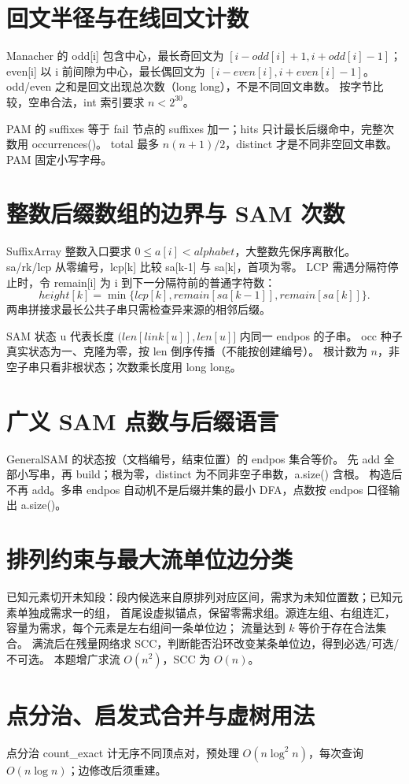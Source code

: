 \section{回文半径与在线回文计数}\label{knowledge-palindrome}
Manacher 的 odd[i] 包含中心，最长奇回文为 $[i-odd[i]+1,i+odd[i]-1]$；
even[i] 以 i 前间隙为中心，最长偶回文为 $[i-even[i],i+even[i]-1]$。
odd/even 之和是回文出现总次数（long long），不是不同回文串数。
按字节比较，空串合法，int 索引要求 $n<2^{30}$。

PAM 的 suffixes 等于 fail 节点的 suffixes 加一；hits 只计最长后缀命中，完整次数用 occurrences()。
total 最多 $n(n+1)/2$，distinct 才是不同非空回文串数。PAM 固定小写字母。
\section{整数后缀数组的边界与 SAM 次数}\label{knowledge-suffix-bounds}
SuffixArray 整数入口要求 $0\le a[i]<alphabet$，大整数先保序离散化。
sa/rk/lcp 从零编号，lcp[k] 比较 sa[k-1] 与 sa[k]，首项为零。
LCP 需遇分隔符停止时，令 remain[i] 为 i 到下一分隔符前的普通字符数：
\[
 height[k]=\min\{lcp[k],remain[sa[k-1]],remain[sa[k]]\}.
\]
两串拼接求最长公共子串只需检查异来源的相邻后缀。

SAM 状态 u 代表长度 $(len[link[u]],len[u]]$ 内同一 endpos 的子串。
occ 种子真实状态为一、克隆为零，按 len 倒序传播（不能按创建编号）。
根计数为 $n$，非空子串只看非根状态；次数乘长度用 long long。
\section{广义 SAM 点数与后缀语言}\label{knowledge-general-sam}
GeneralSAM 的状态按（文档编号，结束位置）的 endpos 集合等价。
先 add 全部小写串，再 build；根为零，distinct 为不同非空子串数，a.size() 含根。
构造后不再 add。多串 endpos 自动机不是后缀并集的最小 DFA，点数按 endpos 口径输出 a.size()。
\section{排列约束与最大流单位边分类}\label{knowledge-flow-units}
已知元素切开未知段：段内候选来自原排列对应区间，需求为未知位置数；已知元素单独成需求一的组，
首尾设虚拟锚点，保留零需求组。源连左组、右组连汇，容量为需求，每个元素是左右组间一条单位边；
流量达到 $k$ 等价于存在合法集合。
满流后在残量网络求 SCC，判断能否沿环改变某条单位边，得到必选/可选/不可选。
本题增广求流 $O(n^2)$，SCC 为 $O(n)$。
\section{点分治、启发式合并与虚树用法}\label{knowledge-tree-uses}
点分治 count\_exact 计无序不同顶点对，预处理 $O(n\log^2n)$，每次查询 $O(n\log n)$；边修改后须重建。


